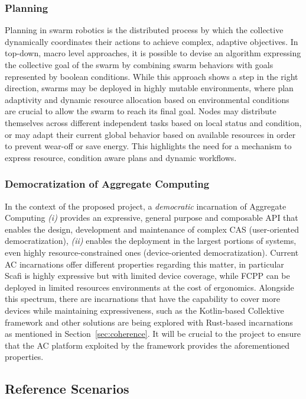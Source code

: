\documentclass[12pt]{article}
\begin{document}
\subsubsection{Planning}
Planning in swarm robotics is the distributed process by which the collective dynamically coordinates their actions to achieve complex, adaptive objectives.
In top-down, macro level approaches, it is possible to devise an algorithm expressing the collective goal of the swarm by combining swarm behaviors with goals represented by boolean conditions.
While this approach shows a step in the right direction, swarms may be deployed in highly mutable environments, where plan adaptivity and dynamic resource allocation based on environmental conditions
are crucial to allow the swarm to reach its final goal. Nodes may distribute themselves across different independent tasks based on local status and condition, or may adapt their current global behavior
based on available resources in order to prevent wear-off or save energy.
This highlights the need for a mechanism to express resource, condition aware plans and dynamic workflows.

\subsubsection{Democratization of Aggregate Computing}
In the context of the proposed project, a \textit{democratic} incarnation of Aggregate Computing \textit{(i)} provides an expressive, general purpose and
composable API that enables the design, development and maintenance of complex CAS (user-oriented democratization), \textit{(ii)} enables the deployment
in the largest portions of systems, even highly resource-constrained ones (device-oriented democratization). Current AC incarnations offer different properties
regarding this matter, in particular Scafi is highly expressive but with limited device coverage, while FCPP can be deployed in limited resources environments
at the cost of ergonomics. Alongside this spectrum, there are incarnations that have the capability to cover more devices while maintaining expressiveness, such as the Kotlin-based
Collektive framework and other solutions are being explored with Rust-based incarnations as mentioned in Section~\ref{sec:coherence}. It will be crucial to the project
to ensure that the AC platform exploited by the framework provides the aforementioned properties.

\subsection{Reference Scenarios}
\label{sec:scenarios}
\end{document}

